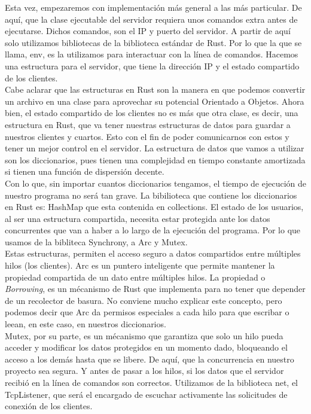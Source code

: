\documentclass{article}
\begin{document}
Esta vez, empezaremos con implementación más general a las más particular. De aquí, que la clase ejecutable del servidor requiera unos comandos extra antes de ejecutarse. Dichos comandos, son el IP y puerto del servidor. A partir de aquí solo utilizamos bibliotecas de la biblioteca estándar de Rust. Por lo que la que se llama, env, es la utilizamos para interactuar con la línea de comandos. Hacemos una estructura para el servidor, que tiene la dirección IP y el estado compartido de los clientes.\\

Cabe aclarar que las estructuras en Rust son la manera en que podemos convertir un archivo en una clase para aprovechar su potencial Orientado a Objetos. Ahora bien, el estado compartido de los clientes no es más que otra clase, es decir, una estructura en Rust, que va tener nuestras estructuras de datos para guardar a nuestros clientes y cuartos. Esto con el fin de poder comunicarnos con estos y tener un mejor control en el servidor. La estructura de datos que vamos a utilizar son los diccionarios, pues tienen una complejidad en tiempo constante amortizada si tienen una función de dispersión decente.\\

Con lo que, sin importar cuantos diccionarios tengamos, el tiempo de ejecución de nuestro programa no será tan grave. La bibilioteca que contiene los diccionarios en Rust es: HashMap que esta contenida en collections. El estado de los usuarios, al ser una estructura compartida, necesita estar protegida ante los datos concurrentes que van a haber a lo largo de la ejecución del programa. Por lo que usamos de la bibliteca Synchrony, a Arc y Mutex.\\

Estas estructuras, permiten el acceso seguro a datos compartidos entre múltiples hilos (los clientes). Arc es un puntero inteligente que permite mantener la propiedad compartida de un dato entre múltiples hilos. La propiedad o \textit{Borrowing}, es un mécanismo de Rust que implementa para no tener que depender de un recolector de basura. No conviene mucho explicar este concepto, pero podemos decir que Arc da permisos especiales a cada hilo para que escribar o leean, en este caso, en nuestros diccionarios.\\

Mutex, por su parte, es un mécanismo que garantiza que solo un hilo pueda acceder y modificar los datos protegidos en un momento dado, bloqueando el acceso a los demás hasta que se libere. De aquí, que la concurrencia en nuestro proyecto sea segura. Y antes de pasar a los hilos, si los datos que el servidor recibió en la línea de comandos son correctos. Utilizamos de la biblioteca net, el TcpListener, que será el encargado de escuchar activamente las solicitudes de conexión de los clientes.\\
\end{document}
